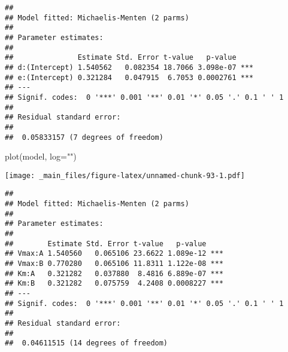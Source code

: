 \documentclass[
]{book}
\newenvironment{Shaded}{\begin{snugshade}}{\end{snugshade}}
\newcommand{\AttributeTok}[1]{\textcolor[rgb]{0.77,0.63,0.00}{#1}}
\newcommand{\CommentTok}[1]{\textcolor[rgb]{0.56,0.35,0.01}{\textit{#1}}}
\newcommand{\DecValTok}[1]{\textcolor[rgb]{0.00,0.00,0.81}{#1}}
\newcommand{\FunctionTok}[1]{\textcolor[rgb]{0.00,0.00,0.00}{#1}}
\newcommand{\NormalTok}[1]{#1}
\newcommand{\OtherTok}[1]{\textcolor[rgb]{0.56,0.35,0.01}{#1}}
\newcommand{\SpecialCharTok}[1]{\textcolor[rgb]{0.00,0.00,0.00}{#1}}
\newcommand{\StringTok}[1]{\textcolor[rgb]{0.31,0.60,0.02}{#1}}
\begin{document}
\begin{verbatim}
## 
## Model fitted: Michaelis-Menten (2 parms)
## 
## Parameter estimates:
## 
##               Estimate Std. Error t-value   p-value    
## d:(Intercept) 1.540562   0.082354 18.7066 3.098e-07 ***
## e:(Intercept) 0.321284   0.047915  6.7053 0.0002761 ***
## ---
## Signif. codes:  0 '***' 0.001 '**' 0.01 '*' 0.05 '.' 0.1 ' ' 1
## 
## Residual standard error:
## 
##  0.05833157 (7 degrees of freedom)
\end{verbatim}

\begin{Shaded}
\begin{Highlighting}[]
\FunctionTok{plot}\NormalTok{(model, }\AttributeTok{log=}\StringTok{""}\NormalTok{)}
\end{Highlighting}
\end{Shaded}

\texttt{[image: \_main\_files/figure-latex/unnamed-chunk-93-1.pdf]}

\begin{Shaded}
\end{Shaded}

\begin{verbatim}
## 
## Model fitted: Michaelis-Menten (2 parms)
## 
## Parameter estimates:
## 
##        Estimate Std. Error t-value   p-value    
## Vmax:A 1.540560   0.065106 23.6622 1.089e-12 ***
## Vmax:B 0.770280   0.065106 11.8311 1.122e-08 ***
## Km:A   0.321282   0.037880  8.4816 6.889e-07 ***
## Km:B   0.321282   0.075759  4.2408 0.0008227 ***
## ---
## Signif. codes:  0 '***' 0.001 '**' 0.01 '*' 0.05 '.' 0.1 ' ' 1
## 
## Residual standard error:
## 
##  0.04611515 (14 degrees of freedom)
\end{verbatim}
\end{document}
